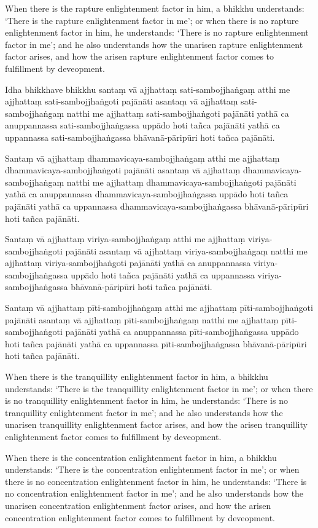 When there is the rapture enlightenment factor in him, a bhikkhu understands:
`There is the rapture enlightenment factor in me'; or when there is no rapture
enlightenment factor in him, he understands: `There is no rapture enlightenment
factor in me'; and he also understands how the unarisen rapture enlightenment
factor arises, and how the arisen rapture enlightenment factor comes to
fulfillment by deveopment.

\paliPage

Idha bhikkhave bhikkhu santaṃ vā ajjhattaṃ sati-sambojjhaṅgaṃ atthi me ajjhattaṃ
sati-sambojjhaṅgoti pajānāti asantaṃ vā ajjhattaṃ sati-sambojjhaṅgaṃ natthi me
ajjhattaṃ sati-sambojjhaṅgoti pajānāti yathā ca anuppannassa sati-sambojjhaṅgassa
uppādo hoti tañca pajānāti yathā ca uppannassa sati-sambojjhaṅgassa
bhāvanā-pāripūri hoti tañca pajānāti.

Santaṃ vā ajjhattaṃ dhammavicaya-sambojjhaṅgaṃ atthi me ajjhattaṃ
dhammavicaya-sambojjhaṅgoti pajānāti asantaṃ vā ajjhattaṃ
dhammavicaya-sambojjhaṅgaṃ natthi me ajjhattaṃ dhammavicaya-sambojjhaṅgoti
pajānāti yathā ca anuppannassa dhammavicaya-sambojjhaṅgassa uppādo hoti tañca
pajānāti yathā ca uppannassa dhammavicaya-sambojjhaṅgassa bhāvanā-pāripūri hoti
tañca pajānāti.

Santaṃ vā ajjhattaṃ viriya-sambojjhaṅgaṃ atthi me ajjhattaṃ viriya-sambojjhaṅgoti
pajānāti asantaṃ vā ajjhattaṃ viriya-sambojjhaṅgaṃ natthi me ajjhattaṃ
viriya-sambojjhaṅgoti pajānāti yathā ca anuppannassa viriya-sambojjhaṅgassa uppādo
hoti tañca pajānāti yathā ca uppannassa viriya-sambojjhaṅgassa bhāvanā-pāripūri
hoti tañca pajānāti.

Santaṃ vā ajjhattaṃ pīti-sambojjhaṅgaṃ atthi me ajjhattaṃ pīti-sambojjhaṅgoti
pajānāti asantaṃ vā ajjhattaṃ pīti-sambojjhaṅgaṃ natthi me ajjhattaṃ
pīti-sambojjhaṅgoti pajānāti yathā ca anuppannassa pīti-sambojjhaṅgassa uppādo
hoti tañca pajānāti yathā ca uppannassa pīti-sambojjhaṅgassa bhāvanā-pāripūri hoti
tañca pajānāti.

\englishPage

When there is the tranquillity enlightenment factor in him, a bhikkhu
understands: `There is the tranquillity enlightenment factor in me'; or when
there is no tranquillity enlightenment factor in him, he understands: `There is
no tranquillity enlightenment factor in me'; and he also understands how the
unarisen tranquillity enlightenment factor arises, and how the arisen
tranquillity enlightenment factor comes to fulfillment by deveopment.

When there is the concentration enlightenment factor in him, a bhikkhu
understands: `There is the concentration enlightenment factor in me'; or when
there is no concentration enlightenment factor in him, he understands: `There is
no concentration enlightenment factor in me'; and he also understands how the
unarisen concentration enlightenment factor arises, and how the arisen
concentration enlightenment factor comes to fulfillment by deveopment.

